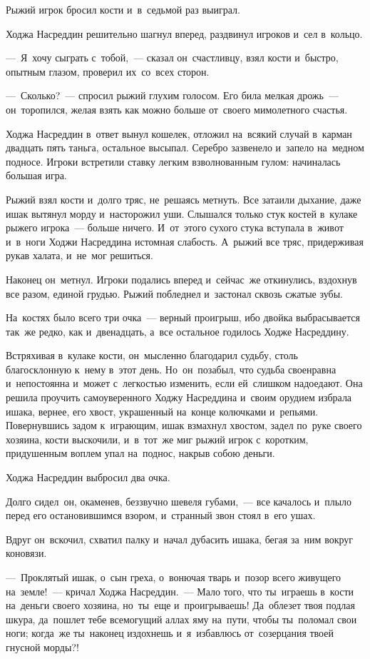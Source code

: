 \documentclass[12pt,a4paper]{book}
\begin{document}
Рыжий игрок бросил кости и~в~седьмой раз выиграл.

Ходжа Насреддин решительно шагнул вперед, раздвинул игроков и~сел в~кольцо.

—~Я~хочу сыграть с~тобой,~— сказал он~счастливцу, взял кости и~быстро, опытным глазом, проверил их~со~всех сторон.

—~Сколько?~— спросил рыжий глухим голосом. Его била мелкая дрожь~— он~торопился, желая взять как можно больше от~своего мимолетного счастья.

Ходжа Насреддин в~ответ вынул кошелек, отложил на~всякий случай в~карман двадцать пять таньга, остальное высыпал. Серебро зазвенело и~запело на~медном подносе. Игроки встретили ставку легким взволнованным гулом: начиналась большая игра.

Рыжий взял кости и~долго тряс, не~решаясь метнуть. Все затаили дыхание, даже ишак вытянул морду и~насторожил уши. Слышался только стук костей в~кулаке рыжего игрока~— больше ничего. И~от~этого сухого стука вступала в~живот и~в~ноги Ходжи Насреддина истомная слабость. А~рыжий все тряс, придерживая рукав халата, и~не~мог решиться.

Наконец он~метнул. Игроки подались вперед и~сейчас~же откинулись, вздохнув все разом, единой грудью. Рыжий побледнел и~застонал сквозь сжатые зубы.

На~костях было всего три очка~— верный проигрыш, ибо двойка выбрасывается так~же редко, как и~двенадцать, а~все остальное годилось Ходже Насреддину.

Встряхивая в~кулаке кости, он~мысленно благодарил судьбу, столь благосклонную к~нему в~этот день. Но~он~позабыл, что судьба своенравна и~непостоянна и~может с~легкостью изменить, если ей~слишком надоедают. Она решила проучить самоуверенного Ходжу Насреддина и~своим орудием избрала ишака, вернее, его хвост, украшенный на~конце колючками и~репьями. Повернувшись задом к~играющим, ишак взмахнул хвостом, задел по~руке своего хозяина, кости выскочили, и~в~тот~же миг рыжий игрок с~коротким, придушенным воплем упал на~поднос, накрыв собою деньги.

Ходжа Насреддин выбросил два очка.

Долго сидел~он, окаменев, беззвучно шевеля губами,~— все качалось и~плыло перед его остановившимся взором, и~странный звон стоял в~его ушах.

Вдруг он~вскочил, схватил палку и~начал дубасить ишака, бегая за~ним вокруг коновязи.

—~Проклятый ишак, о~сын греха, о~вонючая тварь и~позор всего живущего на~земле!~— кричал Ходжа Насреддин.~— Мало того, что ты~играешь в~кости на~деньги своего хозяина, но~ты~еще и~проигрываешь! Да~облезет твоя подлая шкура, да~пошлет тебе всемогущий аллах яму на~пути, чтобы ты~поломал свои ноги; когда~же ты~наконец издохнешь и~я~избавлюсь от~созерцания твоей гнусной морды?!
\end{document}
